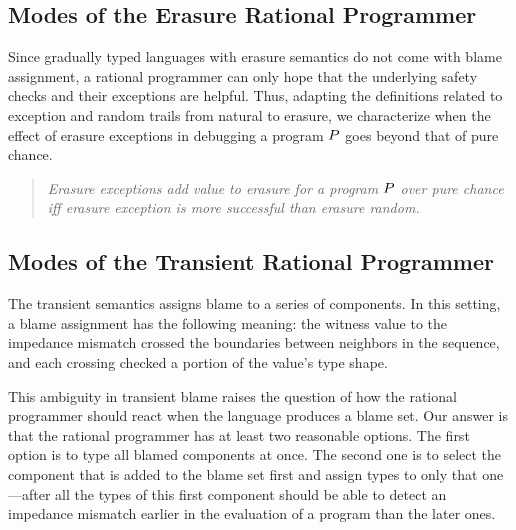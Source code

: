 \subsection{Modes of the Erasure Rational Programmer} \label{sub:erasure}

 Since gradually typed languages with erasure semantics do not come with
 blame assignment, a rational programmer can only hope that the underlying
 safety checks and their exceptions are helpful.  Thus, adapting the
 definitions related to exception and random trails from natural to
 erasure, we characterize when the effect of erasure exceptions in debugging a
 program $P$ goes beyond that of pure chance. 

\begin{quote}
\it
  Erasure exceptions add value to erasure for a program $P$ over pure chance
  iff erasure exception is more successful than erasure random.
\end{quote}
\noindent


\subsection{Modes of the Transient Rational Programmer} \label{sub:transient}

The transient semantics assigns blame to a series of components. In this setting, a
blame assignment has the following meaning: the witness value to the impedance
mismatch crossed the boundaries between neighbors in the sequence, and each crossing
checked a portion of the value's type shape. 

This ambiguity in transient blame raises the question of how the rational programmer
should react when the language produces a blame set. Our answer is that the rational
programmer has at least two reasonable options.  The first option is to type all
blamed components at once. The second one is to select the component that is added
to the blame set first and assign types to only that one---after all the types of
this first component should be able to detect an impedance mismatch earlier in the
evaluation of a program than the later ones.

